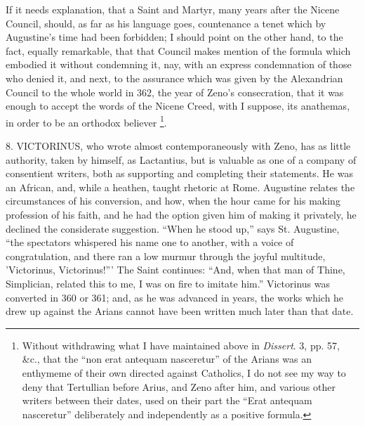 If it needs explanation, that a Saint and Martyr, many years after
the Nicene Council, should, as far as his language goes, countenance a
tenet which by Augustine's time had been forbidden; I should point on
the other hand, to the fact, equally remarkable, that that Council
makes mention of the formula which embodied it without condemning it,
nay, with an express condemnation of those who denied it, and next, to
the assurance which was given by the Alexandrian Council to the whole
world in 362, the year of Zeno's consecration, that it was enough to
accept the words of the Nicene Creed, with I suppose, its anathemas,
in order to be an orthodox believer \footnote{Without
withdrawing what I have maintained above in \emph{Dissert}. 3, pp. 57,
\&c., that the ``non erat antequam nasceretur'' of the
Arians was an enthymeme of their own directed against Catholics, I do
not see my way to deny that Tertullian before Arius, and Zeno after
him, and various other writers between their dates, used on their part
the ``Erat antequam nasceretur'' deliberately and
independently as a positive formula.}.

8. VICTORINUS, who wrote almost
contemporaneously with Zeno, has as little authority, taken by
himself, as Lactantius, but is valuable as one of a company of
consentient writers, both as supporting and completing their
statements. He was an African, and, while a heathen, taught rhetoric
at Rome. Augustine relates the circumstances of his conversion, and
how, when the hour came for his making profession of his faith, and he
had the option given him of making it privately, he declined the considerate suggestion. ``When he stood up,'' says St.
Augustine, ``the spectators whispered his name one to another,
with a voice of congratulation, and there ran a low murmur through the
joyful multitude, 'Victorinus, Victorinus!''' The Saint continues:
``And, when that man of Thine, Simplician, related this to me, I
was on fire to imitate him.'' Victorinus was converted in 360 or
361; and, as he was advanced in years, the works which he drew up
against the Arians cannot have been written much later than that date.

